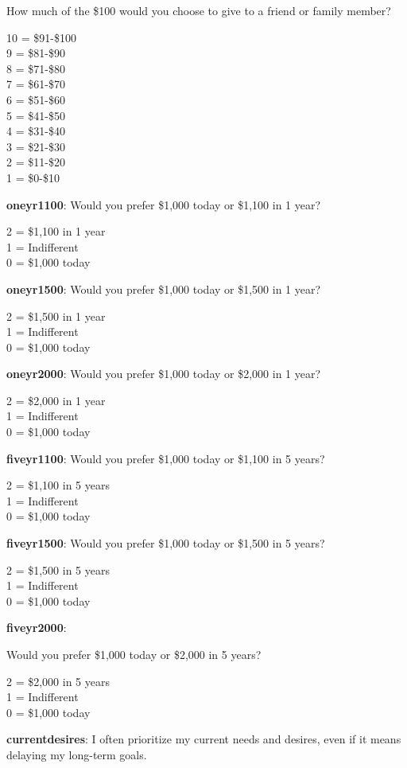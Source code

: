 \documentclass[11pt, headsepline]{article}
\begin{document}
How much of the \$100 would you choose to give to a friend or family member?

10 = \$91-\$100 \\
9 = \$81-\$90 \\
8 = \$71-\$80 \\
7 = \$61-\$70 \\
6 = \$51-\$60 \\
5 = \$41-\$50 \\
4 = \$31-\$40 \\
3 = \$21-\$30 \\
2 = \$11-\$20 \\
1 = \$0-\$10

\textbf{oneyr1100}: Would you prefer \$1,000 today or \$1,100 in 1 year?

2 = \$1,100 in 1 year \\
1 = Indifferent \\
0 = \$1,000 today

\textbf{oneyr1500}: Would you prefer \$1,000 today or \$1,500 in 1 year?

2 = \$1,500 in 1 year \\
1 = Indifferent \\
0 = \$1,000 today

\textbf{oneyr2000}: Would you prefer \$1,000 today or \$2,000 in 1 year?

2 = \$2,000 in 1 year \\
1 = Indifferent \\
0 = \$1,000 today

\textbf{fiveyr1100}: Would you prefer \$1,000 today or \$1,100 in 5 years?

2 = \$1,100 in 5 years \\
1 = Indifferent \\
0 = \$1,000 today

\textbf{fiveyr1500}: Would you prefer \$1,000 today or \$1,500 in 5 years?

2 = \$1,500 in 5 years \\
1 = Indifferent \\
0 = \$1,000 today

\textbf{fiveyr2000}:

Would you prefer \$1,000 today or \$2,000 in 5 years?

2 = \$2,000 in 5 years \\
1 = Indifferent \\
0 = \$1,000 today

\textbf{currentdesires}: I often prioritize my current needs and desires, even if it means delaying my long-term goals.
\end{document}

